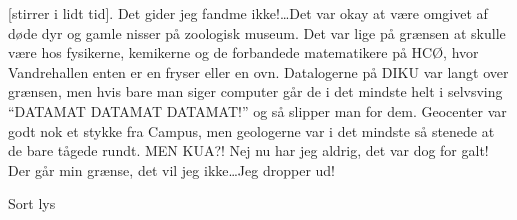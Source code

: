 \documentclass[a4paper,11pt]{article}
\begin{document}
\begin{song}
[stirrer i lidt tid]. Det gider jeg fandme ikke!\ldots Det var okay at være omgivet af døde dyr og gamle nisser på zoologisk museum. Det var lige på grænsen at skulle være hos fysikerne, kemikerne og de forbandede matematikere på HCØ, hvor Vandrehallen enten er en fryser eller en ovn. Datalogerne på DIKU var langt over grænsen, men hvis bare man siger computer går de i det mindste helt i selvsving  “DATAMAT DATAMAT DATAMAT!” og så slipper man for dem. Geocenter var godt nok et stykke fra Campus, men geologerne var i det mindste så stenede at de bare tågede rundt. MEN KUA?!  Nej nu har jeg aldrig, det var dog for galt! Der går min grænse, det vil jeg ikke\ldots Jeg dropper ud!

Sort lys


\end{song}
\end{document}
